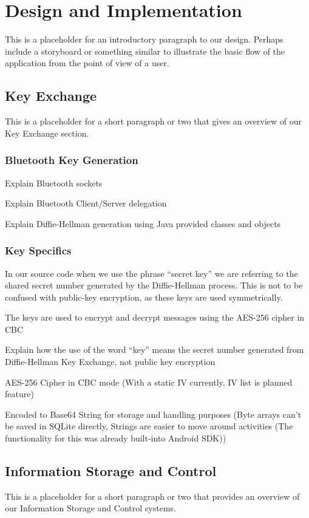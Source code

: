 \section{Design and Implementation}
This is a placeholder for an introductory paragraph to our design. Perhaps include a storyboard or something similar to illustrate the basic flow of the application
from the point of view of a user.

\subsection{Key Exchange}
This is a placeholder for a short paragraph or two that gives an overview of our Key Exchange section.

\subsubsection{Bluetooth Key Generation}
Explain Bluetooth sockets

Explain Bluetooth Client/Server delegation

Explain Diffie-Hellman generation using Java provided classes and objects

\subsubsection{Key Specifics}
In our source code when we use the phrase ``secret key'' we are referring to the shared secret number generated by
the Diffie-Hellman process. This is not to be confused with public-key encryption, as these keys are used symmetrically.

The keys are used to encrypt and decrypt messages using the AES-256 cipher in CBC

Explain how the use of the word ``key'' means the secret number generated from Diffie-Hellman Key Exchange, not public key encryption

AES-256 Cipher in CBC mode (With a static IV currently, IV list is planned feature)

Encoded to Base64 String for storage and handling purposes (Byte arrays can't be saved in SQLite directly, Strings are easier to move around activities (The functionality for this was already built-into Android SDK))

\subsection{Information Storage and Control}
This is a placeholder for a short paragraph or two that provides an overview of our Information Storage and Control systems.

